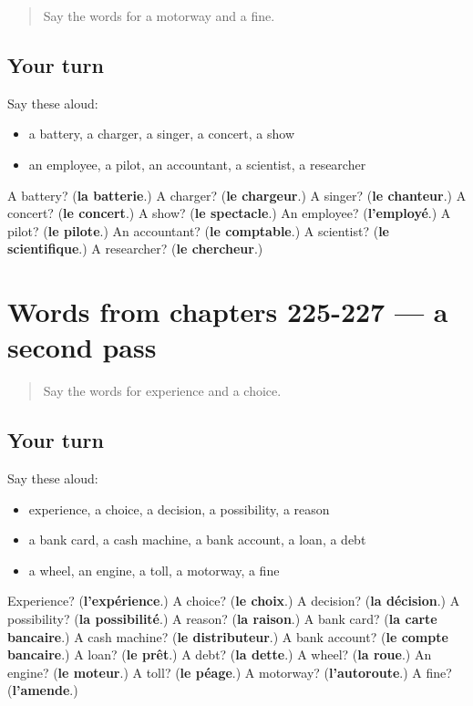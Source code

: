\begin{quote}
Say the words for a motorway and a fine.
\end{quote}

\subsection*{Your turn}
Say these aloud:

\begin{itemize}
\raggedright
  \item a battery, a charger, a singer, a concert, a show
  \item an employee, a pilot, an accountant, a scientist, a researcher
\end{itemize}

\begin{tcolorbox}[breakable,colback=teal!4,colframe=teal!35!black,title={Before you move on}]
A battery? (\textbf{la batterie}.) A charger? (\textbf{le chargeur}.) A singer? (\textbf{le chanteur}.) A concert? (\textbf{le concert}.) A show? (\textbf{le spectacle}.) An employee? (\textbf{l'employé}.) A pilot? (\textbf{le pilote}.) An accountant? (\textbf{le comptable}.) A scientist? (\textbf{le scientifique}.) A researcher? (\textbf{le chercheur}.)
\end{tcolorbox}
\section[(dialogue)]{Words from chapters 225-227 — a second pass}

\label{lesson:FR-R227-second-pass-words-from-chapters-225-227}



\begin{quote}
Say the words for experience and a choice.
\end{quote}

\subsection*{Your turn}
Say these aloud:

\begin{itemize}
\raggedright
  \item experience, a choice, a decision, a possibility, a reason
  \item a bank card, a cash machine, a bank account, a loan, a debt
  \item a wheel, an engine, a toll, a motorway, a fine
\end{itemize}

\begin{tcolorbox}[breakable,colback=teal!4,colframe=teal!35!black,title={Before you move on}]
Experience? (\textbf{l'expérience}.) A choice? (\textbf{le choix}.) A decision? (\textbf{la décision}.) A possibility? (\textbf{la possibilité}.) A reason? (\textbf{la raison}.) A bank card? (\textbf{la carte bancaire}.) A cash machine? (\textbf{le distributeur}.) A bank account? (\textbf{le compte bancaire}.) A loan? (\textbf{le prêt}.) A debt? (\textbf{la dette}.) A wheel? (\textbf{la roue}.) An engine? (\textbf{le moteur}.) A toll? (\textbf{le péage}.) A motorway? (\textbf{l'autoroute}.) A fine? (\textbf{l'amende}.)
\end{tcolorbox}
